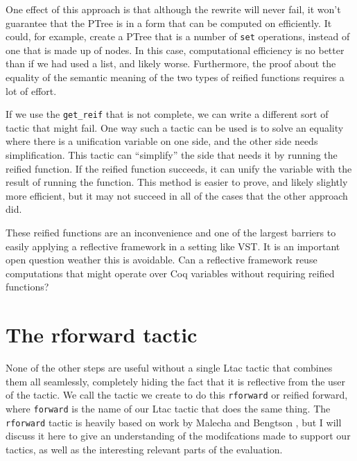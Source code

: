 \documentclass{puthesis}
\begin{document}
One effect of this approach is that although the rewrite will never
fail, it won't guarantee that the PTree is in a form that can be
computed on efficiently. It could, for example, create a PTree that is
a number of \lstinline|set| operations, instead of one that is made up
of nodes. In this case, computational efficiency is no better than if
we had used a list, and likely worse. Furthermore, the proof about the
equality of the semantic meaning of the two types of reified functions
requires a lot of effort.

If we use the \lstinline|get_reif| that is not complete, we can write a
different sort of tactic that might fail. One way such a tactic can be
used is to solve an equality where there is a unification variable on
one side, and the other side needs simplification. This tactic can
``simplify'' the side that needs it by running the reified
function. If the reified function succeeds, it can unify the variable
with the result of running the function. This method is easier to
prove, and likely slightly more efficient, but it may not succeed in
all of the cases that the other approach did.

These reified functions are an inconvenience and one of the largest
barriers to easily applying a reflective framework in a setting like
VST. It is an important open question weather this is avoidable. Can
a reflective framework reuse computations that might operate
over Coq variables without requiring reified functions? 

\section{The rforward tactic}

None of the other steps are useful without a single Ltac tactic that
combines them all seamlessly, completely hiding the fact that it is
reflective from the user of the tactic. We call the tactic we create
to do this \lstinline|rforward| or reified forward, where
\lstinline|forward| is the name of our Ltac tactic that does the same
thing. The \lstinline|rforward| tactic is heavily based on work by
Malecha and Bengtson \cite{}, but I will discuss it here to give an
understanding of the modifcations made to support our tactics, as well
as the interesting relevant parts of the evaluation. 
\end{document}

